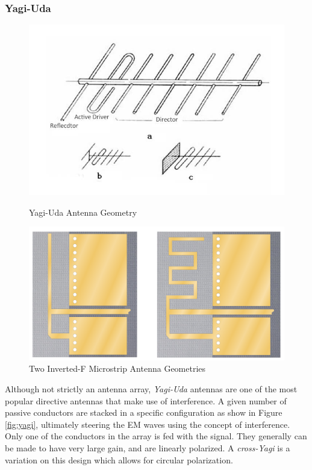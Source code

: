 \subsubsection{Yagi-Uda}
\begin{figure}[!htb]
  \begin{minipage}{.49\textwidth}
    \centering
    \includegraphics[width=0.8\linewidth]{yagi}
    \caption{Yagi-Uda Antenna Geometry \cite{site-icantennasYagi}}
    \label{fig:yagi}
  \end{minipage}
  \begin{minipage}{.49\textwidth}
    \centering
    \includegraphics[width=0.8\linewidth]{invertedF}
    \caption{Two Inverted-F Microstrip Antenna Geometries \cite{site-invertedFAntenna}}
    \label{fig:invertedF}
  \end{minipage}
\end{figure}

Although not strictly an antenna array, \textit{Yagi-Uda} antennas are one of the most popular directive antennas that make use of interference. A given number of passive conductors are stacked in a specific configuration as show in Figure \ref{fig:yagi}, ultimately steering the EM waves using the concept of interference. Only one of the conductors in the array is fed with the signal. They generally can be made to have very large gain, and are linearly polarized. A \textit{cross-Yagi} is a variation on this design which allows for circular polarization.

